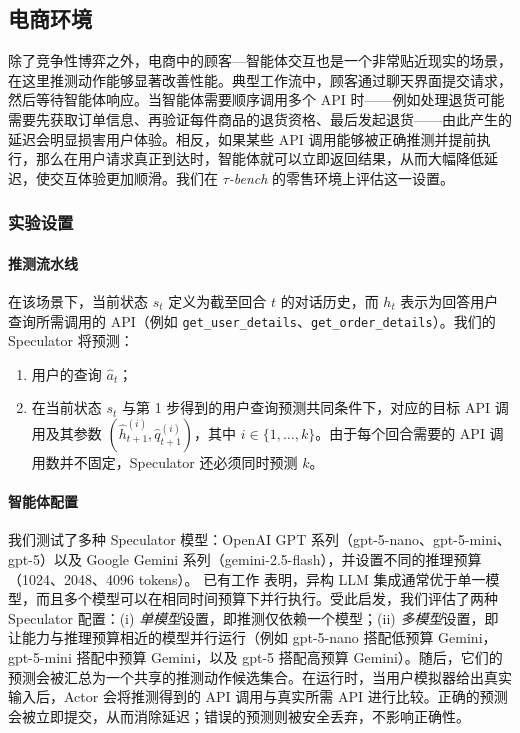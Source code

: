 \subsection{电商环境}
\label{subsec:ecommerce}
除了竞争性博弈之外，电商中的顾客—智能体交互也是一个非常贴近现实的场景，在这里推测动作能够显著改善性能。典型工作流中，顾客通过聊天界面提交请求，然后等待智能体响应。当智能体需要顺序调用多个 API 时——例如处理退货可能需要先获取订单信息、再验证每件商品的退货资格、最后发起退货——由此产生的延迟会明显损害用户体验。相反，如果某些 API 调用能够被正确推测并提前执行，那么在用户请求真正到达时，智能体就可以立即返回结果，从而大幅降低延迟，使交互体验更加顺滑。我们在 \emph{$\tau$-bench} 的零售环境上评估这一设置\cite{yao_Taubench_2024}。

\subsubsection{实验设置}
\paragraph{推测流水线}
在该场景下，当前状态 $s_t$ 定义为截至回合 $t$ 的对话历史，而 $h_t$ 表示为回答用户查询所需调用的 API（例如 \texttt{get\_user\_details}、\texttt{get\_order\_details}）。我们的 Speculator 将预测：
\begin{enumerate}
    \item 用户的查询 $\hat{a}_t$；
    \item 在当前状态 $s_t$ 与第 1 步得到的用户查询预测共同条件下，对应的目标 API 调用及其参数 $(\hat{h}_{t+1}^{(i)}, \hat{q}_{t+1}^{(i)})$，其中 $i \in \{1, \ldots, k\}$。由于每个回合需要的 API 调用数并不固定，Speculator 还必须同时预测 $k$。
\end{enumerate}

\paragraph{智能体配置}
我们测试了多种 Speculator 模型：OpenAI GPT 系列（gpt-5-nano、gpt-5-mini、gpt-5）以及 Google Gemini 系列（gemini-2.5-flash），并设置不同的推理预算（1024、2048、4096 tokens）。
已有工作\cite{jiang-etal-2023-llm, chen_LLMEnsemble_2025} 表明，异构 LLM 集成通常优于单一模型，而且多个模型可以在相同时间预算下并行执行。受此启发，我们评估了两种 Speculator 配置：(i) \emph{单模型}设置，即推测仅依赖一个模型；(ii) \emph{多模型}设置，即让能力与推理预算相近的模型并行运行（例如 gpt-5-nano 搭配低预算 Gemini，gpt-5-mini 搭配中预算 Gemini，以及 gpt-5 搭配高预算 Gemini）。随后，它们的预测会被汇总为一个共享的推测动作候选集合。在运行时，当用户模拟器给出真实输入后，Actor 会将推测得到的 API 调用与真实所需 API 进行比较。正确的预测会被立即提交，从而消除延迟；错误的预测则被安全丢弃，不影响正确性。

